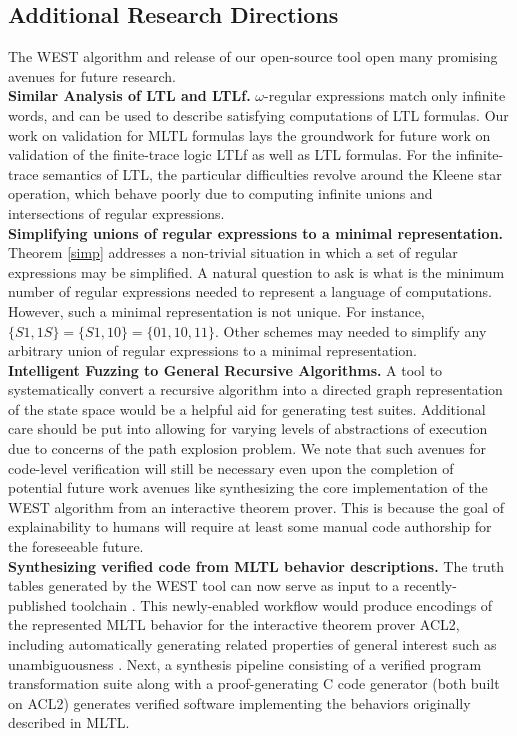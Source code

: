 \documentclass[runningheads]{llncs}
\begin{document}
\subsection{Additional Research Directions} The WEST algorithm and release of our open-source tool open many promising avenues for future research. \\
\textbf{Similar Analysis of LTL and LTLf.}
$\omega$-regular expressions match only infinite words, and can be used to describe satisfying computations of LTL formulas.%
Our work on validation for MLTL formulas lays the groundwork for future work on validation of the finite-trace logic LTLf \cite{GV13} as well as LTL formulas. For the infinite-trace semantics of LTL, the particular difficulties revolve around the Kleene star operation, which behave poorly due to computing infinite unions and intersections of regular expressions.\\
\noindent \textbf{Simplifying unions of regular expressions to a minimal representation.}
Theorem \ref{simp} addresses a non-trivial situation in which a set of regular expressions may be simplified. A natural question to ask is what is the minimum number of regular expressions needed to represent a language of computations. However, such a minimal representation is not unique. For instance, $\{S1, 1S\} = \{S1, 10\} = \{01, 10, 11\}$. Other schemes may needed to simplify any arbitrary union of regular expressions to a minimal representation.\\
\noindent \textbf{Intelligent Fuzzing to General Recursive Algorithms.}
A tool to systematically convert a recursive algorithm
into a directed graph representation of the state space would be a helpful aid for generating test suites. 
Additional care should be put into allowing for varying levels of abstractions of execution due to concerns of the path explosion problem. We note that such avenues for code-level verification will still be necessary even upon the completion of potential future work avenues like synthesizing the core implementation of the WEST algorithm from an interactive theorem prover. This is because the goal of explainability to humans will require at least some manual code authorship for the foreseeable future. \\
\noindent \textbf{Synthesizing verified code from MLTL behavior descriptions.} The truth tables generated by the WEST tool can now serve as input to a recently-published toolchain \cite{dasc-2022}. This newly-enabled workflow would produce encodings of the represented MLTL behavior for the interactive theorem prover ACL2, including automatically generating related properties of general interest such as unambiguousness \cite{DBLP:journals/corr/abs-2205-11707,ACL2-Site,ACL2-Doc}. Next, a synthesis pipeline consisting of a verified program transformation suite \cite{Kestrel-APT} along with a proof-generating C code generator \cite{DBLP:journals/corr/abs-2205-11708} (both built on ACL2) generates verified software implementing the behaviors originally described in MLTL.
\end{document}
